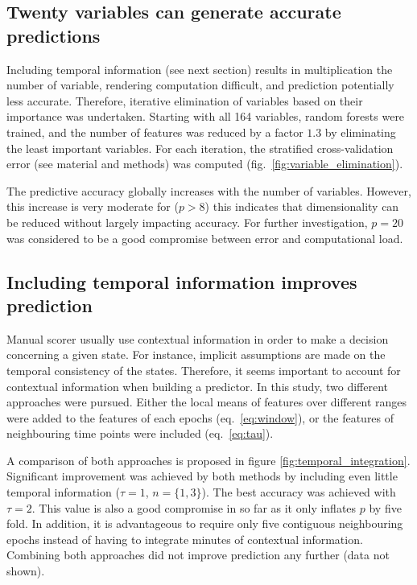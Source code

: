\subsection{Twenty variables can generate accurate predictions}
Including temporal information (see next section) results in multiplication the number of variable, rendering computation difficult, and prediction potentially less accurate.
Therefore, iterative elimination of variables based on their importance was undertaken.
Starting with all 164 variables, random forests were trained, and the number of features was reduced by a factor $1.3$  by eliminating the least important variables.
For each iteration, the stratified cross-validation error (see material and methods) was computed (fig.~\ref{fig:variable_elimination}).


The predictive accuracy globally increases with the number of variables.
However, this increase is very moderate for ($p>8$) this indicates that dimensionality can be reduced without largely impacting accuracy.
For further investigation, $p=20$ was considered to be a good compromise between error and computational load.


\subsection{Including temporal information improves prediction}
Manual scorer usually use contextual information in order to make a decision concerning a given state.
For instance, implicit assumptions are made on the temporal consistency of the states.
Therefore, it seems important to account for contextual information when building a predictor.
In this study, two different approaches were pursued.
Either the local means of features over different ranges were added to the features
of each epochs (eq.~\ref{eq:window}),
or the features of neighbouring time points were included (eq.~\ref{eq:tau}).

A comparison of both approaches is proposed in figure \ref{fig:temporal_integration}.
Significant improvement was achieved by both methods by including even little temporal information ($\tau = 1$, $n=\{1,3\}$).
The best accuracy was achieved with $\tau = 2$.
This value is also a good compromise in so far as it only inflates $p$ by five fold.
In addition, it is advantageous to require only five contiguous neighbouring epochs instead of having to integrate minutes of contextual information.
Combining both approaches did not improve prediction any further (data not shown).

